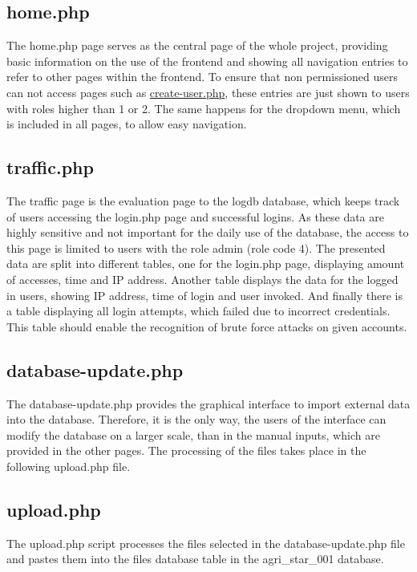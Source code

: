 
\subsection{home.php}

The home.php page serves as the central page of the whole project, providing basic information on the use of the frontend and showing all navigation entries to refer to other pages 
within the frontend. To ensure that non permissioned users can not access pages such as \hyperref[create-user.php]{create-user.php}, these entries are just shown to users with roles 
higher than 1 or 2. The same happens for the dropdown menu, which is included in all pages, to allow easy navigation. 

\subsection{traffic.php}
The traffic page is the evaluation page to the logdb database, which keeps track of users accessing the login.php page and successful logins. As these data are highly sensitive and 
not important for the daily use of the database, the access to this page is limited to users with the role admin (role code 4). The presented data are split into different tables, 
one for the login.php page, displaying amount of accesses, time and IP address. Another table displays the data for the logged in users, showing IP address, time of login and user 
invoked. And finally there is a table displaying all login attempts, which failed due to incorrect credentials. This table should enable the recognition of brute force attacks on 
given accounts.

\subsection{database-update.php}
The database-update.php provides the graphical interface to import external data into the database. Therefore, it is the only way, the users of the interface can modify the database 
on a larger scale, than in the manual inputs, which are provided in the other pages. The processing of the files takes place in the following upload.php file.

\subsection{upload.php}
The upload.php script processes the files selected in the database-update.php file and pastes them into the files database table in the agri\_star\_001 database.